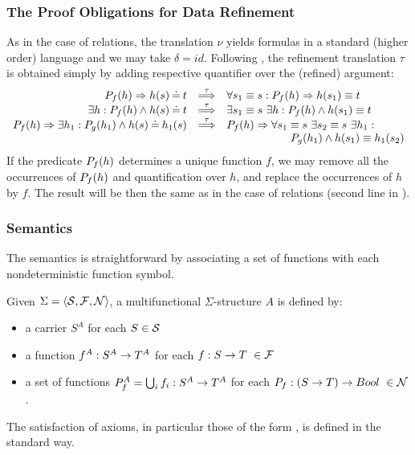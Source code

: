 \subsubsection{The Proof Obligations for Data Refinement} As in the case of relations, the translation $\nu$ yields formulas in a standard (higher order) language and we may take $\delta = id.$ Following , the refinement translation $\tau$ is obtained simply by adding respective quantifier over the (refined) argument: \begin{equation}\label{eq:predstau}
\begin{array}{rcl}
\Pre Pf(h)\impl h(s)\Eq t & \TTo{\tau} & 
\forall s_1\equiv s: \Pre Pf(h)\impl h(s_1)\equiv t \\ \exists h: \Pre Pf(h)\land h(s)\Eq t & \TTo{\tau} & \exists s_1\equiv s\ \exists h: \Pre Pf(h)\land h(s_1)\equiv t\ \ \ \ \ \ \ \ \
\\
\Pre Pf(h)\impl \exists h_1 :\Pre Pg(h_1)\land h(s)\Eq h_1(s) & \TTo{\tau} & \Pre Pf(h)\impl \forall s_1\equiv s\ \exists s_2\equiv s\ \exists h_1 :\\ \multicolumn{3}{r}{ \Pre Pg(h_1)\land h(s_1)\equiv h_1(s_2)} \end{array}
\end{equation}
If the predicate $P_{f}(h)$ determines a unique function $f$, we may remove all the occurrences of $P_{f}(h)$ and quantification over $h$,
and replace the occurrences of
$h$ by $f$. The result will be then the same as in the case of relations (second line in ).

\subsubsection{Semantics}\label{subsub:problem} The semantics is straightforward by associating a set of functions with each nondeterministic function symbol.
\begin{DEFINITION}
Given $\Sigma = \langle{\cal S},{\cal F},\cal N\rangle$, a multifunctional $\Sigma$-structure
$A$ is defined by:
\begin{itemize}\MyLPar
\item a carrier $S^A$ for each $S\in{\cal S}$ \item a function $f^A:S^A\rightarrow T^A$ for each $f:S\into T\ \in\Funcs$ \item a set of functions $P^A_f =\bigcup_i f_i:S^A\rightarrow T^A$ for each $P_{f}:(S\rightarrow T)\rightarrow Bool\ \in \cal N$. \end{itemize}
\end{DEFINITION}
\noindent The satisfaction of axioms, in particular those of the form , is defined in the standard way. 


